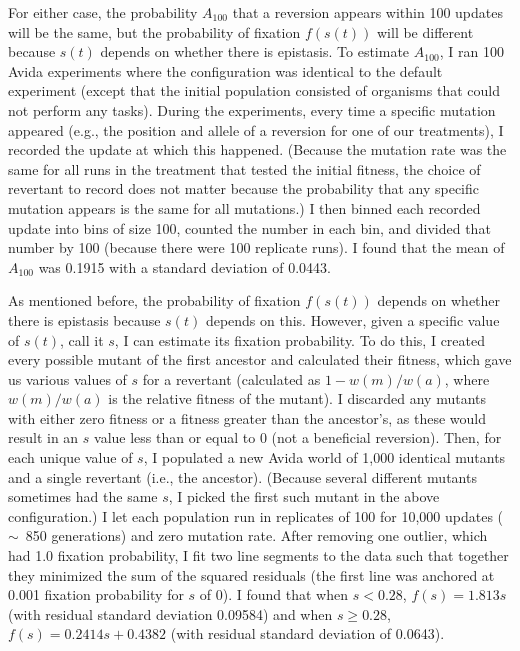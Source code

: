 \begin{doublespace}
For either case, the probability $A_{100}$ that a reversion appears
within 100 updates will be the same,
but the probability of fixation $f(s(t))$ will be different because
$s(t)$ depends on whether there is epistasis.
%
To estimate $A_{100}$, I ran 100 Avida experiments where the configuration was
identical to the default experiment (except that the initial population
consisted of organisms that could not perform any tasks).
%
During the experiments, every time a specific mutation appeared
(e.g., the position and allele of a reversion for one of our treatments),
I recorded the update at which this happened.
%
(Because the mutation rate was the same for all runs in the treatment
that tested the initial fitness, the choice of revertant to record
does not matter because the probability that any specific mutation appears
is the same for all mutations.)
%
I then binned each recorded update into bins of size 100,
counted the number in each bin, and divided that number by 100
(because there were 100 replicate runs).
%
I found that the mean of $A_{100}$ was 0.1915
with a standard deviation of 0.0443.



As mentioned before, the probability of fixation $f(s(t))$
depends on whether there is epistasis because $s(t)$ depends on this.
%
However, given a specific value of $s(t)$, call it $s$,
I can estimate its fixation probability.
%
To do this, I created every possible mutant of the first ancestor
and calculated their fitness, which gave us various values of $s$
for a revertant (calculated as $1 - w(m) / w(a)$,
where $w(m) / w(a)$ is the relative fitness of the mutant).
%
I discarded any mutants with either zero fitness
or a fitness greater than the ancestor's,
as these would result in an $s$ value less than or equal to 0
(not a beneficial reversion).
%
Then, for each unique value of $s$, I populated a new Avida world of 1,000
identical mutants and a single revertant (i.e., the ancestor).
%
(Because several different mutants sometimes had the same $s$,
I picked the first such mutant in the above configuration.)
%
I let each population run in replicates of 100 for 10,000 updates
($\sim$~850 generations) and zero mutation rate.
%
After removing one outlier, which had 1.0 fixation probability,
I fit two line segments to the data such that together they minimized
the sum of the squared residuals (the first line was anchored
at 0.001 fixation probability for $s$ of 0).
%
I found that when $s < 0.28$, $f(s) = 1.813s$
(with residual standard deviation 0.09584) and when $s \ge 0.28$,
$f(s) = 0.2414s + 0.4382$ (with residual standard deviation of 0.0643).




\end{doublespace}
